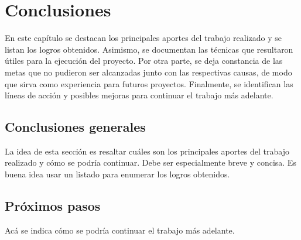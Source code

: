 
\chapter{Conclusiones} %

\label{Chapter5} %

En este capítulo se destacan los principales aportes del trabajo realizado y se listan los logros obtenidos.  Asimismo, se documentan las técnicas que resultaron  útiles para la ejecución del proyecto.  Por otra parte, se deja constancia de las metas que no pudieron ser alcanzadas junto con las respectivas causas, de modo que sirva como experiencia para futuros proyectos.  Finalmente, se identifican las líneas de acción y posibles mejoras para continuar el trabajo más adelante.


\section{Conclusiones generales }

La idea de esta sección es resaltar cuáles son los principales aportes del trabajo realizado y cómo se podría continuar. Debe ser especialmente breve y concisa. Es buena idea usar un listado para enumerar los logros obtenidos.

\section{Próximos pasos}

Acá se indica cómo se podría continuar el trabajo más adelante.
